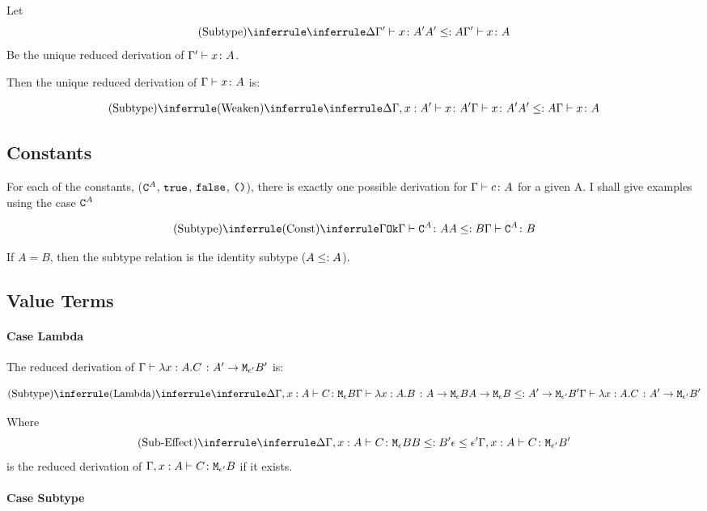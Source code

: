 {Let 
\begin{equation}
    \deltavrule{\G'}{x}{A'}{A}
\end{equation}
Be the  unique reduced derivation of $\Gamma' \vdash x \colon A$.

Then the unique reduced derivation of $\Gamma \vdash x \colon A$ is:


\begin{equation}
    \ntreeruleII{Subtype}{
        \ntreeruleI{Weaken}{
            \treeruleI{\D}{\typerelation{\G, x: A'}{x}{A'}}
        }{\gtyperelation{x}{A'}}   
    }{ A' \subtype A
    }{\gtyperelation{x}{A}}
\end{equation}

\subsection{Constants}
For each of the constants, ($\texttt{C}^{A}$, $\texttt{true}$, $\texttt{false}$, $\texttt{()}$), there is exactly one possible derivation for $\Gamma \vdash c \colon A$ for a given A. I shall give examples using the case $\texttt{C}^{A}$


$$
    \ntreeruleII{Subtype}{\truleconst}{ A \subtype B}{\gtyperelation{\const{A}}{B}}
$$

If $A = B$, then the subtype relation is the identity subtype ($A \leq: A$).

\subsection{Value Terms}
\paragraph{Case Lambda}
The reduced derivation of $\Gamma \vdash \lambda x : A. C\; \colon A' \rightarrow \texttt{M}_{\epsilon'}{B'}$ is:


$$
\ntreeruleII{Subtype}
{\ntreeruleI{Lambda}{\treeruleI{\D}{\typerelation{\gax}{C}{\meb}}}
{
    \gtyperelation{\lam{x}{A}{B}}{\aeb}}
    }{
    \aeb \subtype \lamtype{A'}{\e'}{B'}
}{
   \gtyperelation{\lam{x}{A}{C}}{\lamtype{A'}{\e'}{B'}} 
}
$$

Where 
\begin{equation}
    \ntreeruleII{Sub-Effect}{\treeruleI{\D}{\typerelation{\gax}{C}{\meb}}}{ B\subtype B'}{ \e \subeffect \e'}{\typerelation{\gax}{C}{\M{\e'}{B'}}}
\end{equation}
is the reduced derivation of $\Gamma, x: A \vdash C \colon \texttt{M}_{\epsilon'}{B}$ if it exists.

\paragraph{Case Subtype}


}
